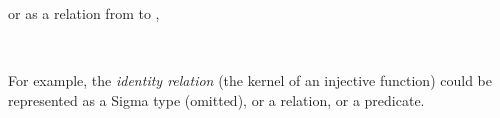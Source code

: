 \documentclass[a4paper,UKenglish,cleveref,autoref,thm-restate,11pt]{lipics-v2021}
\begin{document}
\ccpad
or as a relation from  to ,
\ccpad
\begin{code}%
\>[1]\AgdaSpace{}%
\AgdaSymbol{:}\AgdaSpace{}%
\AgdaSymbol{\{}\AgdaSpace{}%
\AgdaSymbol{:}\AgdaSpace{}%
%
\AgdaSpace{}%
\AgdaSymbol{\}}\AgdaSpace{}%
\AgdaSymbol{\{}\AgdaSpace{}%
\AgdaSymbol{:}\AgdaSpace{}%
%
\AgdaSpace{}%
\AgdaSymbol{\}}\AgdaSpace{}%
\AgdaSpace{}%
\AgdaSymbol{(}\AgdaSpace{}%
\AgdaSpace{}%
\AgdaSymbol{)}\AgdaSpace{}%
\AgdaSpace{}%
\AgdaSpace{}%
\AgdaSpace{}%
\<%
\\
%
\>[1]\AgdaSpace{}%
\AgdaSpace{}%
\AgdaSpace{}%
\AgdaSpace{}%
\AgdaSymbol{=}\AgdaSpace{}%
\AgdaSpace{}%
\AgdaSpace{}%
\AgdaSpace{}%
\AgdaSpace{}%
\<%
\end{code}
\ccpad
For example, the \textit{identity relation} (the kernel of an injective function) could be represented as a Sigma type (omitted), or a relation, or a predicate.
\ccpad
\end{document}
